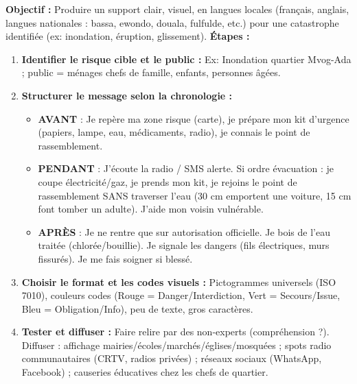 \documentclass[11pt]{article}
\begin{document}
\begin{methode}
\textbf{Objectif :} Produire un support clair, visuel, en langues locales (français, anglais, langues nationales : bassa, ewondo, douala, fulfulde, etc.) pour une catastrophe identifiée (ex: inondation, éruption, glissement).
\textbf{Étapes :}
\begin{enumerate}
    \item \textbf{Identifier le risque cible et le public :} Ex: Inondation quartier Mvog-Ada ; public = ménages chefs de famille, enfants, personnes âgées.
    \item \textbf{Structurer le message selon la chronologie :}
        \begin{itemize}
            \item \textbf{AVANT} : \og Je repère ma zone risque (carte), je prépare mon kit d'urgence (papiers, lampe, eau, médicaments, radio), je connais le point de rassemblement. \fg
            \item \textbf{PENDANT} : \og J'écoute la radio / SMS alerte. Si ordre évacuation : je coupe électricité/gaz, je prends mon kit, je rejoins le point de rassemblement SANS traverser l'eau (30 cm emportent une voiture, 15 cm font tomber un adulte). J'aide mon voisin vulnérable. \fg
            \item \textbf{APRÈS} : \og Je ne rentre que sur autorisation officielle. Je bois de l'eau traitée (chlorée/bouillie). Je signale les dangers (fils électriques, murs fissurés). Je me fais soigner si blessé. \fg
        \end{itemize}
    \item \textbf{Choisir le format et les codes visuels :} Pictogrammes universels (ISO 7010), couleurs codes (Rouge = Danger/Interdiction, Vert = Secours/Issue, Bleu = Obligation/Info), peu de texte, gros caractères.
    \item \textbf{Tester et diffuser :} Faire relire par des non-experts (compréhension ?). Diffuser : affichage mairies/écoles/marchés/églises/mosquées ; spots radio communautaires (CRTV, radios privées) ; réseaux sociaux (WhatsApp, Facebook) ; causeries éducatives chez les chefs de quartier.
\end{enumerate}
\end{methode}
\end{document}

